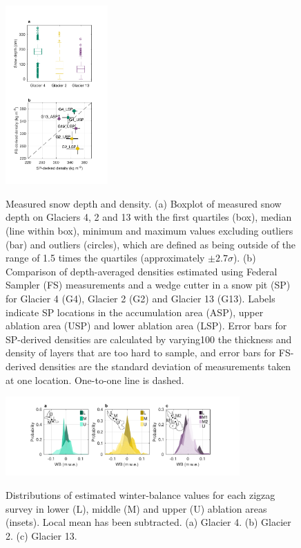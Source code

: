 \documentclass[twocolumn, letterpaper]{igs}
\begin{document}
\begin{figure}
	\centering
	\includegraphics[width =0.35\textwidth]{DepthBoxplot_SPvsFS.pdf}\\
	\caption{Measured snow depth and density. (a) Boxplot of measured snow depth on Glaciers 4, 2 and 13 with the first quartiles (box), median (line within box), minimum and maximum values excluding outliers (bar) and outliers (circles), which are defined as being outside of the range of 1.5 times the quartiles (approximately $\pm2.7\sigma$). (b) Comparison of depth-averaged densities estimated using Federal Sampler (FS) measurements and  a wedge cutter in a snow pit (SP)  for Glacier 4 (G4), Glacier 2 (G2) and Glacier 13 (G13). Labels indicate SP locations in the accumulation area (ASP), upper ablation area (USP) and lower ablation area (LSP). Error bars for SP-derived densities are calculated by varying100 the thickness and density of layers that are too hard to sample, and error bars for FS-derived densities are the standard deviation of measurements taken at one location. One-to-one line is dashed.}
	\label{fig:DepthBoxplot_SPvsFS}
\end{figure}

\begin{figure}
	\centering
	\includegraphics[width =0.8\textwidth]{ZigzagHistogram.pdf}\\
	\caption{Distributions of estimated winter-balance values for each zigzag survey in lower (L), middle (M) and upper (U) ablation areas (insets). Local mean has been subtracted. (a) Glacier 4. (b) Glacier 2. (c) Glacier 13.}
	\label{fig:ZigzagHistogram}
\end{figure}
\end{document}
